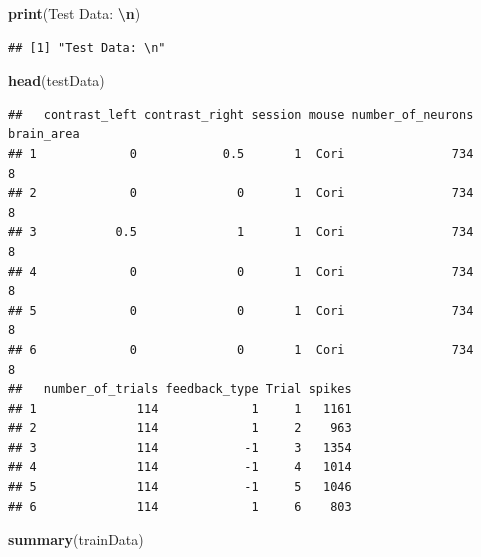 \documentclass[
]{article}
\newenvironment{Shaded}{\begin{snugshade}}{\end{snugshade}}
\newcommand{\FunctionTok}[1]{\textcolor[rgb]{0.13,0.29,0.53}{\textbf{#1}}}
\newcommand{\NormalTok}[1]{#1}
\newcommand{\SpecialCharTok}[1]{\textcolor[rgb]{0.81,0.36,0.00}{\textbf{#1}}}
\newcommand{\StringTok}[1]{\textcolor[rgb]{0.31,0.60,0.02}{#1}}
\begin{document}
\begin{Shaded}
\begin{Highlighting}[]
\FunctionTok{print}\NormalTok{(}\StringTok{\textquotesingle{}Test Data: }\SpecialCharTok{\textbackslash{}n}\StringTok{\textquotesingle{}}\NormalTok{)}
\end{Highlighting}
\end{Shaded}

\begin{verbatim}
## [1] "Test Data: \n"
\end{verbatim}

\begin{Shaded}
\begin{Highlighting}[]
\FunctionTok{head}\NormalTok{(testData)}
\end{Highlighting}
\end{Shaded}

\begin{verbatim}
##   contrast_left contrast_right session mouse number_of_neurons brain_area
## 1             0            0.5       1  Cori               734          8
## 2             0              0       1  Cori               734          8
## 3           0.5              1       1  Cori               734          8
## 4             0              0       1  Cori               734          8
## 5             0              0       1  Cori               734          8
## 6             0              0       1  Cori               734          8
##   number_of_trials feedback_type Trial spikes
## 1              114             1     1   1161
## 2              114             1     2    963
## 3              114            -1     3   1354
## 4              114            -1     4   1014
## 5              114            -1     5   1046
## 6              114             1     6    803
\end{verbatim}

\begin{Shaded}
\begin{Highlighting}[]
\FunctionTok{summary}\NormalTok{(trainData)}
\end{Highlighting}
\end{Shaded}
\end{document}
